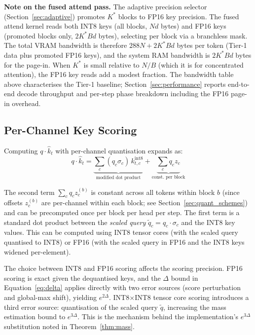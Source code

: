 \documentclass[10pt,twocolumn,a4paper]{article}
\theoremstyle{definition}
\theoremstyle{remark}
\begin{document}
\textbf{Note on the fused attend pass.}  The adaptive precision selector (Section~\ref{sec:adaptive}) promotes $K^*$ blocks to FP16 key precision.  The fused attend kernel reads both INT8 keys (all blocks, $Nd$ bytes) and FP16 keys (promoted blocks only, $2K^*Bd$ bytes), selecting per block via a branchless mask.  The total VRAM bandwidth is therefore $288N + 2K^*Bd$ bytes per token (Tier-1 data plus promoted FP16 keys), and the system RAM bandwidth is $2K^*Bd$ bytes for the page-in.  When $K^*$ is small relative to $N/B$ (which it is for concentrated attention), the FP16 key reads add a modest fraction.  The bandwidth table above characterises the Tier-1 baseline; Section~\ref{sec:performance} reports end-to-end decode throughput and per-step phase breakdown including the FP16 page-in overhead.

\subsection{Per-Channel Key Scoring}
\label{sec:scoring}

Computing $q \cdot \hat{k}_t$ with per-channel quantisation expands as:
\begin{equation}
  q \cdot \hat{k}_t
  = \underbrace{\textstyle\sum_c (q_c \sigma_c)\, k_{t,c}^{\mathrm{int8}}}_{\text{modified dot product}}
  + \underbrace{\textstyle\sum_c q_c z_c}_{\text{const.\ per block}}
\end{equation}

The second term $\sum_c q_c z_c^{(b)}$ is constant across all tokens within block $b$ (since offsets $z_c^{(b)}$ are per-channel within each block; see Section~\ref{sec:quant_schemes}) and can be precomputed once per block per head per step.  The first term is a standard dot product between the \emph{scaled query} $\tilde{q}_c = q_c \cdot \sigma_c$ and the INT8 key values.  This can be computed using INT8 tensor cores (with the scaled query quantised to INT8) or FP16 (with the scaled query in FP16 and the INT8 keys widened per-element).

The choice between INT8 and FP16 scoring affects the scoring precision.  FP16 scoring is exact given the dequantised keys, and the $\Delta$ bound in Equation~\eqref{eq:delta} applies directly with two error sources (score perturbation and global-max shift), yielding $e^{2\Delta}$.  INT8$\times$INT8 tensor core scoring introduces a third error source: quantisation of the scaled query $\tilde{q}$, increasing the mass estimation bound to $e^{3\Delta}$.  This is the mechanism behind the implementation's $e^{3\Delta}$ substitution noted in Theorem~\ref{thm:mass}.
\end{document}
